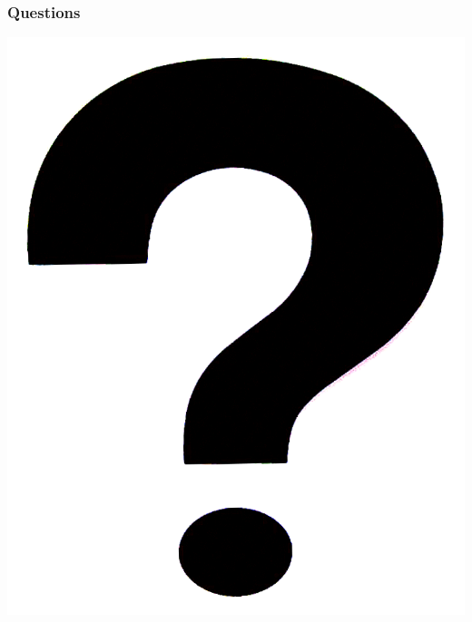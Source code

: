 \documentclass[12pt]{beamer}
\begin{document}
\begin{frame}
\vfill
  \frametitle{Questions}
  \begin{center}
    \vfill
    \includegraphics[scale=0.15]{images/questions.png}
    \vfill
  \end{center}
\vfill
\end{frame}
\end{document}
